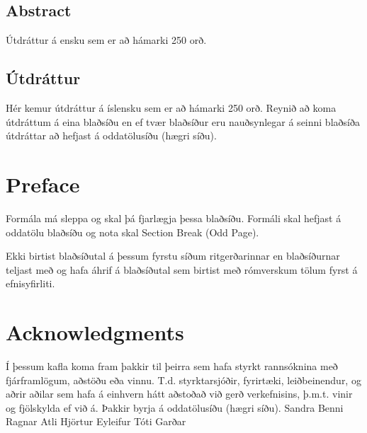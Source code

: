 \documentclass[a4paper,12pt,twoside,BCOR=10mm]{scrbook}
\theoremstyle{definition}
\theoremstyle{definition}
\theoremstyle{definition}
\begin{document}
\setcounter{page}{5}
\section*{\huge Abstract}
Útdráttur á ensku sem er að hámarki 250 orð.
\vfill \vspace*{1cm}
\section*{\huge Útdráttur}
Hér kemur útdráttur á íslensku sem er að hámarki 250 orð. Reynið að koma útdráttum á eina blaðsíðu en ef tvær blaðsíður eru nauðsynlegar á seinni blaðsíða útdráttar að hefjast á oddatölusíðu (hægri síðu).
\vfill
\newpage

\chapter*{Preface}
Formála má sleppa og skal þá fjarlægja þessa blaðsíðu. Formáli skal hefjast á oddatölu blaðsíðu og nota skal Section Break (Odd Page).

Ekki birtist blaðsíðutal á þessum fyrstu síðum ritgerðarinnar en blaðsíðurnar teljast með og hafa áhrif á blaðsíðutal sem birtist með rómverskum tölum fyrst á efnisyfirliti.

\tableofcontents
\listoffigures



\chapter*{Acknowledgments}
Í þessum kafla koma fram þakkir til þeirra sem hafa styrkt rannsóknina með fjárframlögum, aðstöðu eða vinnu. T.d. styrktarsjóðir, fyrirtæki, leiðbeinendur, og aðrir aðilar sem hafa á einhvern hátt aðstoðað við gerð verkefnisins, þ.m.t. vinir og fjölskylda ef við á. Þakkir byrja á oddatölusíðu (hægri síðu).
Sandra
Benni
Ragnar
Atli
Hjörtur
Eyleifur
Tóti
Garðar

\setcounter{page}{1}
\end{document}
